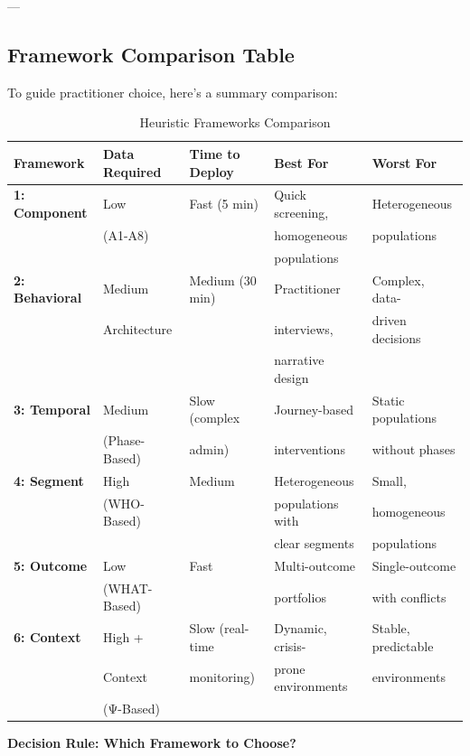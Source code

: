 ---

\subsection{Framework Comparison Table}

To guide practitioner choice, here's a summary comparison:

\begin{table}[htbp]
\centering
\caption{Heuristic Frameworks Comparison}
\label{tab:20-frameworks-compare}
\renewcommand{\arraystretch}{1.4}
\tiny
\begin{tabular}{@{}lllll@{}}
\toprule
\textbf{Framework} & \textbf{Data Required} & \textbf{Time to Deploy} & \textbf{Best For} & \textbf{Worst For} \\
\midrule
\textbf{1: Component} & Low & Fast (5 min) & Quick screening, & Heterogeneous \\
& (A1-A8) & & homogeneous & populations \\
& & & populations & \\
\midrule
\textbf{2: Behavioral} & Medium & Medium (30 min) & Practitioner & Complex, data- \\
& Architecture & & interviews, & driven decisions \\
& & & narrative design & \\
\midrule
\textbf{3: Temporal} & Medium & Slow (complex & Journey-based & Static populations \\
& (Phase-Based) & admin) & interventions & without phases \\
\midrule
\textbf{4: Segment} & High & Medium & Heterogeneous & Small, \\
& (WHO-Based) & & populations with & homogeneous \\
& & & clear segments & populations \\
\midrule
\textbf{5: Outcome} & Low & Fast & Multi-outcome & Single-outcome \\
& (WHAT-Based) & & portfolios & with conflicts \\
\midrule
\textbf{6: Context} & High + & Slow (real-time & Dynamic, crisis- & Stable, predictable \\
& Context & monitoring) & prone environments & environments \\
& (Ψ-Based) & & & \\
\bottomrule
\end{tabular}
\end{table}

\textbf{Decision Rule: Which Framework to Choose?}

